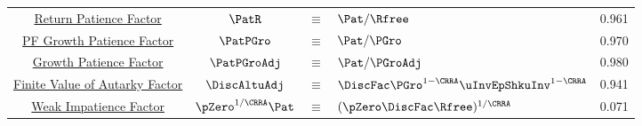 \documentclass[\econtexRoot/BufferStockTeory]{subfiles}
\begin{document}
\begin{table}
{\begin{tabular}{|c|ccl|c|}
\href{https://\owner.github.io/BufferStockTheory\#RPF}{Return Patience Factor}                      & $\PatR$ & $\equiv$ & $\Pat/\Rfree $     & 0.961 \\
\href{https://\owner.github.io/BufferStockTheory\#PFGPF}{PF Growth Patience Factor}    & $\PatPGro$ & $\equiv$ & $\Pat/\PGro $      & 0.970 \\
\href{https://\owner.github.io/BufferStockTheory\#GPF}{\phantom{PF~} Growth Patience Factor}                      & $\PatPGroAdj$ & $\equiv$ & $ \Pat/\PGroAdj$& 0.980 \\
\href{https://\owner.github.io/BufferStockTheory\#FVAF}{Finite Value of Autarky Factor}         & $\DiscAltuAdj $ & $\equiv$ & $ \DiscFac \PGro^{1-\CRRA}\uInvEpShkuInv^{1-\CRRA}$       & 0.941 \\ 
\href{https://\owner.github.io/BufferStockTheory\#WRICCond}{Weak Impatience Factor}         & $\pZero^{1/\CRRA} \Pat $ & $\equiv$ & $ (\pZero \DiscFac \Rfree)^{1/\CRRA}$       & 0.071 \\ \hline
\end{tabular}
} %
\settowidth\TableWidth{\usebox{\Calibration}}
\usebox{\Calibration}

\end{table}
%
\end{document}
